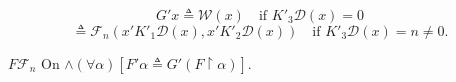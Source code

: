 $$G'x \triangleq \mathcal{W}(x) \quad \text{if } K'_3 \mathcal{D}(x) = 0$$
$$\triangleq \mathcal{F}_n(x'K'_1 \mathcal{D}(x), x'K'_2 \mathcal{D}(x)) \quad \text{if } K'_3 \mathcal{D}(x) = n \neq 0.$$

$F \mathcal{F}_n$ On $\wedge (\forall \alpha)[F' \alpha \triangleq G'(F \upharpoonright \alpha)]$.
